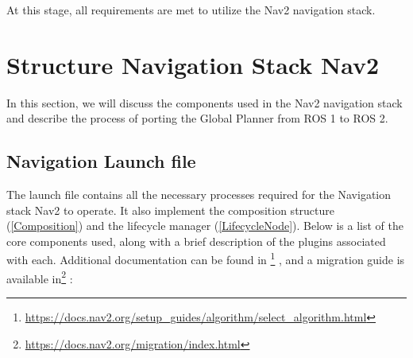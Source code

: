 At this stage, all requirements are met to utilize the Nav2 navigation stack.
\section{Structure Navigation Stack Nav2}
In this section, we will discuss the components used in the Nav2 navigation stack and describe the process of porting the Global Planner from ROS 1 to ROS 2.
\subsection{Navigation Launch file}
The launch file contains all the necessary processes required for the  Navigation stack Nav2 to operate. It also implement the composition structure (\ref{Composition}) and the lifecycle manager (\ref{LifecycleNode}).
Below is a list of the core components used, along with a brief description of the plugins associated with each. Additional documentation can be found in  \footnote{\href{https://docs.nav2.org/setup_guides/algorithm/select_algorithm.html}{https://docs.nav2.org/setup\_guides/algorithm/select\_algorithm.html}} , and a migration guide is available in\footnote{\href{https://docs.nav2.org/migration/index.html}{https://docs.nav2.org/migration/index.html}} :
